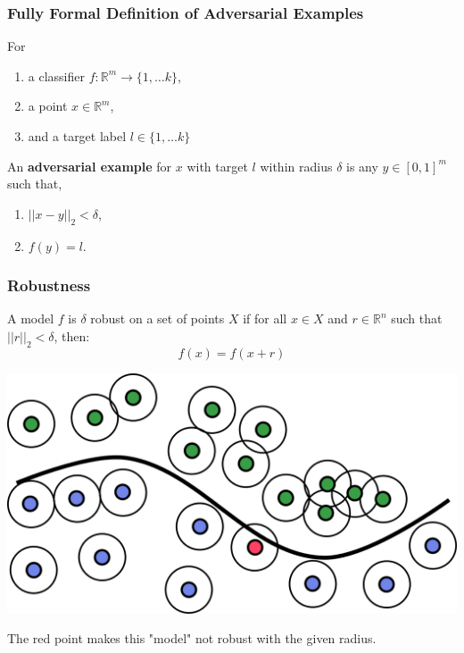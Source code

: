 \documentclass{beamer}
\begin{document}
\begin{frame}
    \frametitle{Fully Formal Definition of Adversarial Examples}
    \begin{definition}
        For  
        \begin{enumerate}
            \item a classifier $f : \mathbb{R}^m \to \{ 1, \dots k \}$,
            \item a point $x \in \mathbb{R}^m$,
            \item and a target label $l \in \{ 1, \dots k \}$
        \end{enumerate}
          
        An \textbf{adversarial example} for $x$ with target $l$ within radius $\delta$ is any $y \in [0,1]^m$ such that, 
        \begin{enumerate}
            \item $||x - y||_2 < \delta$,
            \item $f(y) = l$.
        \end{enumerate}
    \end{definition}
\end{frame}

\begin{frame}
    \frametitle{Robustness}
    \begin{definition}
        A model $f$ is $\delta$ robust on a set of points $X$ if for all $x \in X$ and $r \in \mathbb{R}^n$ such that $||r||_2 < \delta$, then:
        $$f(x) = f(x + r)$$
    \end{definition}
    \begin{center}
        \includegraphics[scale=1.2]{robustness.png}

        The red point makes this "model" not robust with the given radius.
    \end{center}
\end{frame}
\end{document}
